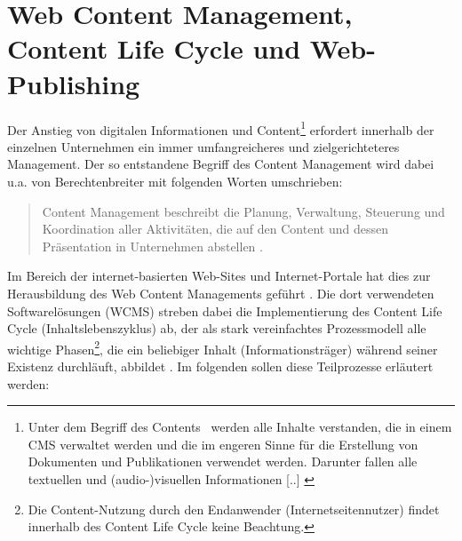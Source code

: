 


\section{Web Content Management, Content Life Cycle und Web-Publishing}
\label{sec:webpublishing}
Der Anstieg von digitalen Informationen und Content\footnote{
\glqq Unter dem Begriff des \flqq Contents\frqq~ werden alle Inhalte verstanden, die in einem CMS verwaltet werden und die im engeren Sinne für die Erstellung von Dokumenten und Publikationen verwendet werden. Darunter fallen alle textuellen und (audio-)visuellen Informationen [..] \citep[S. 297]{TechnischeDok}
} erfordert innerhalb der einzelnen Unternehmen ein immer umfangreicheres und zielgerichteteres Management. Der so entstandene Begriff des Content Management wird dabei u.a. von Berechtenbreiter mit folgenden Worten umschrieben:
\begin{quote}
Content Management beschreibt die Planung, Verwaltung, Steuerung und Koordination aller Aktivitäten, die auf den Content und dessen Präsentation in Unternehmen abstellen \citep[S. 212]{Berchtenbreiter}.
\end{quote}

Im Bereich der internet-basierten Web-Sites und Internet-Portale hat dies zur Herausbildung des Web Content Managements geführt \citep[][S. 3]{ecm}. Die dort verwendeten Softwarelösungen (WCMS) streben dabei die Implementierung des Content Life Cycle (Inhaltslebenszyklus) ab, der als stark vereinfachtes Prozessmodell alle wichtige Phasen\footnote{Die Content-Nutzung durch den Endanwender (Internetseitennutzer) findet innerhalb des Content Life Cycle keine Beachtung.}, die ein beliebiger Inhalt (Informationsträger) während seiner Existenz durchläuft, abbildet \citep[S.303]{TechnischeDok}. Im folgenden sollen diese Teilprozesse erläutert werden:

